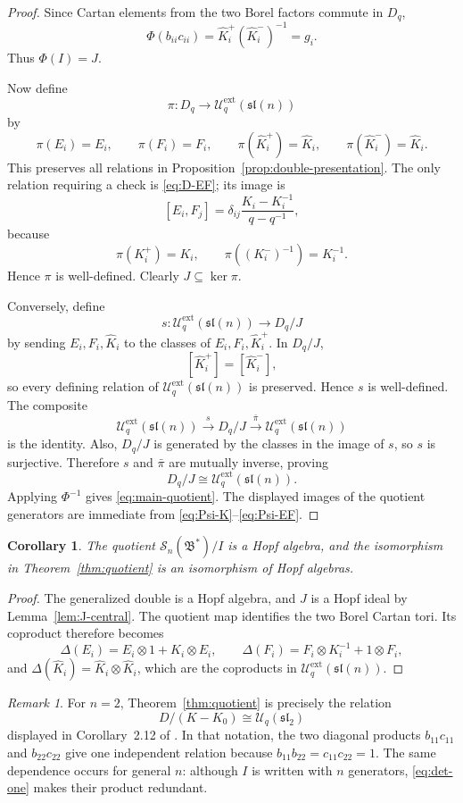 \documentclass[11pt]{amsart}
\numberwithin{equation}{section}
\newtheorem{corollary}[equation]{Corollary}
\theoremstyle{definition}
\theoremstyle{remark}
\newtheorem{remark}[equation]{Remark}
\newcommand{\Uc}{\mathcal{U}}
\newcommand{\bcS}{\mathcal{S}}
\newcommand{\fB}{\mathfrak{B}}
\newcommand{\sln}{\mathfrak{sl}(n)}
\begin{document}
\begin{proof}
Since Cartan elements from the two Borel factors commute in \(D_q\),
\[
\Phi(b_{ii}c_{ii})
=\widehat K_i^{+}(\widehat K_i^{-})^{-1}
=g_i.
\]
Thus \(\Phi(I)=J\).

Now define
\[
\pi:D_q\longrightarrow \Uc_q^{\mathrm{ext}}(\sln)
\]
by
\[
\pi(E_i)=E_i,\qquad
\pi(F_i)=F_i,\qquad
\pi(\widehat K_i^{+})=\widehat K_i,\qquad
\pi(\widehat K_i^{-})=\widehat K_i.
\]
This preserves all relations in
Proposition~\ref{prop:double-presentation}.  The only relation requiring a
check is \eqref{eq:D-EF}; its image is
\[
[E_i,F_j]
=\delta_{ij}
\frac{K_i-K_i^{-1}}{q-q^{-1}},
\]
because
\[
\pi(K_i^{+})=K_i,
\qquad
\pi((K_i^{-})^{-1})=K_i^{-1}.
\]
Hence \(\pi\) is well-defined.  Clearly \(J\subseteq\ker\pi\).

Conversely, define
\[
s:\Uc_q^{\mathrm{ext}}(\sln)\longrightarrow D_q/J
\]
by sending \(E_i,F_i,\widehat K_i\) to the classes of
\(E_i,F_i,\widehat K_i^{+}\).  In \(D_q/J\),
\[
[\widehat K_i^{+}]=[\widehat K_i^{-}],
\]
so every defining relation of \(\Uc_q^{\mathrm{ext}}(\sln)\) is preserved.
Hence \(s\) is well-defined.  The composite
\[
\Uc_q^{\mathrm{ext}}(\sln)
 \xrightarrow{s}D_q/J
 \xrightarrow{\bar\pi}\Uc_q^{\mathrm{ext}}(\sln)
\]
is the identity.  Also, \(D_q/J\) is generated by the classes in the image of
\(s\), so \(s\) is surjective.  Therefore \(s\) and \(\bar\pi\) are mutually
inverse, proving
\[
D_q/J\cong\Uc_q^{\mathrm{ext}}(\sln).
\]
Applying \(\Phi^{-1}\) gives \eqref{eq:main-quotient}.  The displayed images of
the quotient generators are immediate from
\eqref{eq:Psi-K}--\eqref{eq:Psi-EF}.
\end{proof}

\begin{corollary}
The quotient \(\bcS_n(\fB^*)/I\) is a Hopf algebra, and the isomorphism in
Theorem~\ref{thm:quotient} is an isomorphism of Hopf algebras.
\end{corollary}

\begin{proof}
The generalized double is a Hopf algebra, and \(J\) is a Hopf ideal by
Lemma~\ref{lem:J-central}.  The quotient map identifies the two Borel Cartan
tori.  Its coproduct therefore becomes
\[
\Delta(E_i)=E_i\otimes1+K_i\otimes E_i,
\qquad
\Delta(F_i)=F_i\otimes K_i^{-1}+1\otimes F_i,
\]
and \(\Delta(\widehat K_i)=\widehat K_i\otimes\widehat K_i\), which are the
coproducts in \(\Uc_q^{\mathrm{ext}}(\sln)\).
\end{proof}

\begin{remark}
For \(n=2\), Theorem~\ref{thm:quotient} is precisely the relation
\[
D/(K-K_0)\cong \Uc_q(\mathfrak{sl}_2)
\]
displayed in Corollary~2.12 of \cite{StokmanDouble}.  In that notation, the
two diagonal products \(b_{11}c_{11}\) and \(b_{22}c_{22}\) give one
independent relation because \(b_{11}b_{22}=c_{11}c_{22}=1\).  The same
dependence occurs for general \(n\): although \(I\) is written with \(n\)
generators, \eqref{eq:det-one} makes their product redundant.
\end{remark}
\end{document}
